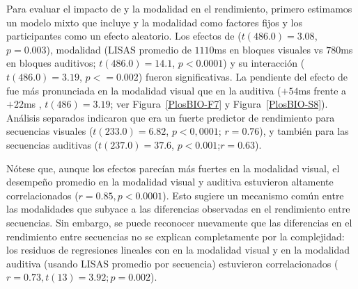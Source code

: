 Para evaluar el impacto de \mdlbin y la modalidad en el rendimiento, primero estimamos un modelo mixto que incluye \mdlbin y la modalidad como factores fijos y los participantes como un efecto aleatorio. Los efectos de \mdlbin ($t (486.0) = 3.08$, $p = 0.003$), modalidad (LISAS promedio de $1110$ms en bloques visuales vs $780$ms en bloques auditivos; $t (486.0) = 14.1$, $p < 0.0001$) y su interacción ($t (486.0) = 3.19$, $p< = 0.002$) fueron significativas. La pendiente del efecto de \mdlbin fue más pronunciada en la modalidad visual que en la auditiva ($+54$ms  frente a $+22$ms , $t (486) = 3.19$; ver Figura~\ref{PlosBIO-F7} y Figura~\ref{PlosBIO-S8}). Análisis separados indicaron que \mdlbin era un fuerte predictor de rendimiento para secuencias visuales ($t (233.0) = 6.82$, $p < 0,0001$; $r = 0.76$), y también para las secuencias auditivas ($t (237.0) = 37.6$, $p < 0.001$;$ r = 0.63$).


Nótese que, aunque los efectos parecían más fuertes en la modalidad visual, el desempeño promedio en la modalidad visual y auditiva estuvieron altamente correlacionados ($r = 0.85, p < 0.0001$). Esto sugiere un mecanismo común entre las modalidades que subyace a las diferencias observadas en el rendimiento entre secuencias. Sin embargo, se puede reconocer nuevamente que las diferencias en el rendimiento entre secuencias no se explican completamente por la complejidad: los residuos de regresiones lineales con \mdlbin en la modalidad visual y en la modalidad auditiva (usando LISAS promedio por secuencia) estuvieron correlacionados ($r = 0.73, t (13) = 3.92; p = 0.002$).


